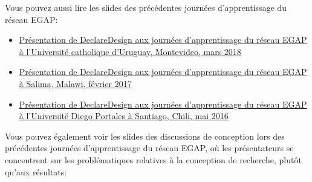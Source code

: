 \documentclass[12pt,]{book}
\begin{document}
Vous pouvez aussi lire les slides des précédentes journées d'apprentissage du réseau EGAP:

\begin{itemize}
\item
  \href{https://egap.github.io/learningdays-resources/Slides/Examples/declare_design-montevideo.pdf}{Présentation de DeclareDesign aux journées d'apprentissage du réseau EGAP à l'Université catholique d'Uruguay, Montevideo, mars 2018}
\item
  \href{https://egap.github.io/learningdays-resources/Slides/Examples/declare_design-malawi.pdf}{Présentation de DeclareDesign aux journées d'apprentissage du réseau EGAP à Salima, Malawi, février 2017}
\item
  \href{https://egap.github.io/learningdays-resources/Slides/Examples/declare_design-santiago.pdf}{Présentation de DeclareDesign aux journées d'apprentissage du réseau EGAP à l'Université Diego Portales à Santiago, Chili, mai 2016}
\end{itemize}

Vous pouvez également voir les slides des discussions de conception lors des précédentes journées d'apprentissage du réseau EGAP, où les présentateurs se concentrent sur les problématiques relatives à la conception de recherche, plutôt qu'aux résultats:
\end{document}
